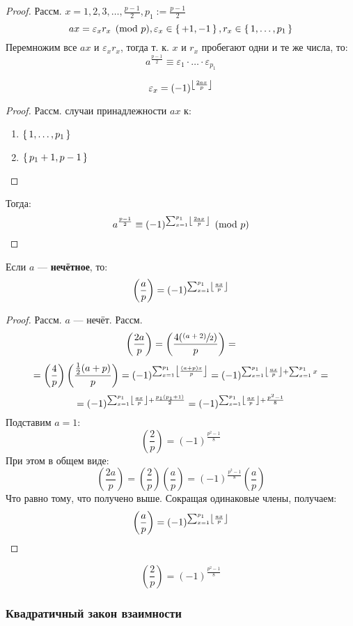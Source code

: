 \begin{proof}
Рассм. $x = 1, 2, 3, \ldots, \frac{p - 1}{2}, p_1 := \frac{p - 1}{2}$
\[
ax = \varepsilon_x r_x \pmod p, \varepsilon_x \in \set{+1, -1}, r_x \in \set{1, \ldots, p_1}
\]
Перемножим все $ax$ и $\varepsilon_x r_x$, тогда т. к. $x$ и $r_x$ пробегают одни и те же числа, то:
\[
a^{\frac{p - 1}{2}} \equiv \varepsilon_1 \cdot \ldots \cdot \varepsilon_{p_1}
\]
\begin{statement}
  \label{statement:01_3}
\[
\varepsilon_x = (-1)^{\left\lfloor \frac{2ax}{p} \right\rfloor}
\]
\end{statement}
\begin{proof}
Рассм. случаи принадлежности $ax$ к:
\begin{enumerate}
  \item $\set{1, \ldots, p_1}$
  \item $\set{p_1 + 1, p - 1}$
\end{enumerate}
\end{proof}
Тогда:
\[
  a^{\frac{p - 1}{2}} \equiv (-1)^{\sum_{x = 1}^{p_1} \left\lfloor \frac{2ax}{p} \right\rfloor} \pmod p
\]
\end{proof}
\begin{statement}
  \label{statement:01_4}
Если $a$ --- \textbf{нечётное}, то:
\[
  \left(\frac{a}{p}\right) = (-1)^{\sum_{x = 1}^{p_1} \left\lfloor \frac{ax}{p} \right\rfloor}
\]
\end{statement}
\begin{proof}
Рассм. $a$ --- нечёт. Рассм.
\[
  \left(\frac{2a}{p}\right) = \left(\frac{4(\sfrac{(a + 2)}{2})}{p}\right) = 
\]
\[
  = \left(\frac{4}{p}\right)\left(\frac{\frac{1}{2}(a + p)}{p}\right) = (-1)^{\sum_{x = 1}^{p_1} \left\lfloor \frac{(a + p)x}{p} \right\rfloor} = (-1)^{\sum_{x = 1}^{p_1} \left\lfloor \frac{ax}{p} \right\rfloor + \sum_{x = 1}^{p_1} x} = 
\]
\[
 = (-1)^{\sum_{x = 1}^{p_1} \left\lfloor \frac{ax}{p} \right\rfloor + \frac{p_1(p_1 + 1)}{2}} = (-1)^{\sum_{x = 1}^{p_1} \left\lfloor \frac{ax}{p} \right\rfloor + \frac{p ^{2} - 1}{8}}
\]
Подставим $a = 1$:
\[
  \left(\frac{2}{p}\right) = (-1)^{\frac{p ^{2} - 1}{8}}
\]
При этом в общем виде:
\[
  \left(\frac{2a}{p}\right) = \left(\frac{2}{p}\right) \left(\frac{a}{p}\right) = (-1)^{\frac{p ^{2} - 1}{8}}\left(\frac{a}{p}\right)
\]
Что равно тому, что получено выше. Сокращая одинаковые члены, получаем:
\[
  \left(\frac{a}{p}\right) = (-1)^{\sum_{x = 1}^{p_1} \left\lfloor \frac{ax}{p} \right\rfloor}
\]
\end{proof}
\begin{consequence}
  \label{cs:01_5}
  \[
    \left(\frac{2}{p}\right) = (-1)^{\frac{p ^{2} - 1}{8}}
  \]
\end{consequence}
\subsubsection{Квадратичный закон взаимности}

